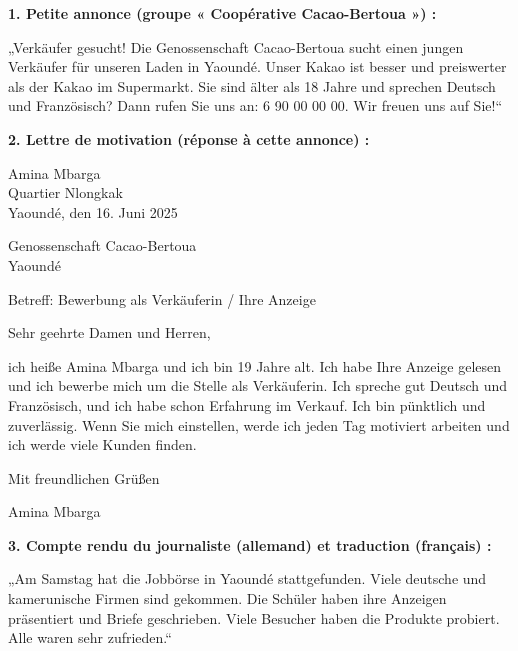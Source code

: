 \documentclass[11pt]{article}
\begin{document}
\begin{exoresolu}
\textbf{1. Petite annonce (groupe « Coopérative Cacao-Bertoua ») :}

\begin{textebox}
„Verkäufer gesucht! Die Genossenschaft Cacao-Bertoua sucht einen jungen Verkäufer für unseren Laden in Yaoundé. Unser Kakao ist besser und preiswerter als der Kakao im Supermarkt. Sie sind älter als 18 Jahre und sprechen Deutsch und Französisch? Dann rufen Sie uns an: 6 90 00 00 00. Wir freuen uns auf Sie!“
\end{textebox}

\textbf{2. Lettre de motivation (réponse à cette annonce) :}

\begin{textebox}
Amina Mbarga \\
Quartier Nlongkak \\
Yaoundé, den 16. Juni 2025

Genossenschaft Cacao-Bertoua \\
Yaoundé

Betreff: Bewerbung als Verkäuferin / Ihre Anzeige

Sehr geehrte Damen und Herren,

ich heiße Amina Mbarga und ich bin 19 Jahre alt. Ich habe Ihre Anzeige gelesen und ich bewerbe mich um die Stelle als Verkäuferin. Ich spreche gut Deutsch und Französisch, und ich habe schon Erfahrung im Verkauf. Ich bin pünktlich und zuverlässig. Wenn Sie mich einstellen, werde ich jeden Tag motiviert arbeiten und ich werde viele Kunden finden.

Mit freundlichen Grüßen

Amina Mbarga
\end{textebox}

\textbf{3. Compte rendu du journaliste (allemand) et traduction (français) :}

\begin{textebox}
„Am Samstag hat die Jobbörse in Yaoundé stattgefunden. Viele deutsche und kamerunische Firmen sind gekommen. Die Schüler haben ihre Anzeigen präsentiert und Briefe geschrieben. Viele Besucher haben die Produkte probiert. Alle waren sehr zufrieden.“
\end{textebox}


\end{exoresolu}
\end{document}
